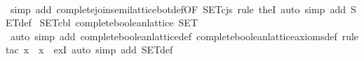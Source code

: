 \begin{isabellebody}
%
\isadelimproof
\ \ %
\endisadelimproof
%
\isatagproof
{}\isamarkupfalse%
\ {}simp\ add{}\ complete{}join{}semilattice{}bot{}def{}OF\ SET{}cjs{}{}\ rule\ the{}I{}{}\ auto\ simp\ add{}\ SET{}def{}%
\endisatagproof
{\isafoldproof}%
%
\isadelimproof
\isanewline
%
\endisadelimproof
\isanewline
{}\isamarkupfalse%
\ SET{}cbl{}\ {}complete{}boolean{}lattice\ SET{}\isanewline
%
\isadelimproof
\ \ %
\endisadelimproof
%
\isatagproof
{}\isamarkupfalse%
\ {}auto\ simp\ add{}\ complete{}boolean{}lattice{}def\ complete{}boolean{}lattice{}axioms{}def{}\ rule{}tac\ x\ {}\ {}{}x{}\ \ exI{}\ auto\ simp\ add{}\ SET{}def{}%
\endisatagproof
{\isafoldproof}%
%
\isadelimproof
\isanewline
%
\endisadelimproof
%
\isadelimtheory
\isanewline
%
\endisadelimtheory
%
\isatagtheory
{}\isamarkupfalse%
%
\endisatagtheory
{\isafoldtheory}%
%
\isadelimtheory
\isanewline
%
\endisadelimtheory
\end{isabellebody}%
